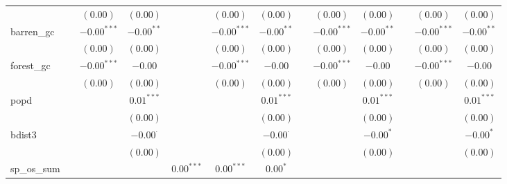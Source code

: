 \begin{sidewaystable}
\begin{center}
{\begin{tabular}{l c c c c c c c c c c c c}
                    &               & $(0.00)$      & $(0.00)$        &               & $(0.00)$      & $(0.00)$        &               & $(0.00)$      & $(0.00)$        &                & $(0.00)$      & $(0.00)$        \\
barren\_gc          &               & $-0.00^{***}$ & $-0.00^{**}$    &               & $-0.00^{***}$ & $-0.00^{**}$    &               & $-0.00^{***}$ & $-0.00^{**}$    &                & $-0.00^{***}$ & $-0.00^{**}$    \\
                    &               & $(0.00)$      & $(0.00)$        &               & $(0.00)$      & $(0.00)$        &               & $(0.00)$      & $(0.00)$        &                & $(0.00)$      & $(0.00)$        \\
forest\_gc          &               & $-0.00^{***}$ & $-0.00$         &               & $-0.00^{***}$ & $-0.00$         &               & $-0.00^{***}$ & $-0.00$         &                & $-0.00^{***}$ & $-0.00$         \\
                    &               & $(0.00)$      & $(0.00)$        &               & $(0.00)$      & $(0.00)$        &               & $(0.00)$      & $(0.00)$        &                & $(0.00)$      & $(0.00)$        \\
popd                &               &               & $0.01^{***}$    &               &               & $0.01^{***}$    &               &               & $0.01^{***}$    &                &               & $0.01^{***}$    \\
                    &               &               & $(0.00)$        &               &               & $(0.00)$        &               &               & $(0.00)$        &                &               & $(0.00)$        \\
bdist3              &               &               & $-0.00^{\cdot}$ &               &               & $-0.00^{\cdot}$ &               &               & $-0.00^{*}$     &                &               & $-0.00^{*}$     \\
                    &               &               & $(0.00)$        &               &               & $(0.00)$        &               &               & $(0.00)$        &                &               & $(0.00)$        \\
sp\_os\_sum         &               &               &                 & $0.00^{***}$  & $0.00^{***}$  & $0.00^{*}$      &               &               &                 &                &               &                 \\

\end{tabular}}
\end{center}
\end{sidewaystable}
